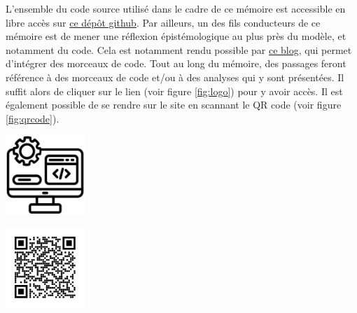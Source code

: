 \begin{tcolorbox}[title=Avertissement]
    L'ensemble du code source utilisé dans le cadre de ce mémoire est accessible en libre accès sur \href{https://github.com/ggenelot/damage-functions-modeling}{ce dépôt github}. Par ailleurs, un des fils conducteurs de ce mémoire est de mener une réflexion épistémologique au plus près du modèle, et notamment du code. Cela est notamment rendu possible par \href{https://damage-functions-modeling.readthedocs.io/en/latest/index.html}{ce blog}, qui permet d'intégrer des morceaux de code. Tout au long du mémoire, des passages feront référence à des morceaux de code et/ou à des analyses qui y sont présentées. Il suffit alors de cliquer sur le lien (voir figure \ref{fig:logo}) pour y avoir accès. Il est également possible de se rendre sur le site en scannant le QR code (voir figure \ref{fig:qrcode}). \\

    \begin{center}
        \begin{minipage}{0.3\textwidth} %
            \centering
            \includegraphics[width=3cm]{figures/logos/development.png}
            \label{fig:logo}
        \end{minipage}%
        \hspace{0.05\textwidth} %
        \begin{minipage}{0.3\textwidth} %
            \centering
            \includegraphics[width=3cm]{illustrations/frame.png} %
            \label{fig:qrcode}
        \end{minipage}
    \end{center}



    
\end{tcolorbox}


